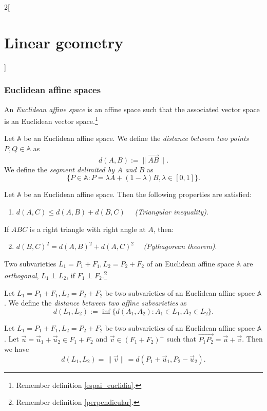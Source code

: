 \documentclass[class=article,10pt,crop=false]{standalone}
\begin{document}
\begin{multicols}{2}[\section{Linear geometry}]
\subsubsection*{Euclidean affine spaces}
\begin{definition}
An \textit{Euclidean affine space} is an affine space such that the associated vector space is an Euclidean vector space.\footnote{Remember definition \ref{espai_euclidia}.}
\end{definition}
\begin{definition}
Let $\mathbb{A}$ be an Euclidean affine space. We define the \textit{distance between two points $P,Q\in\mathbb{A}$} as $$d(A,B):=\|\overrightarrow{AB}\|.$$ We define the \textit{segment delimited by $A$ and $B$} as $$\{P\in\mathbb{A}:P=\lambda A+(1-\lambda)B,\lambda\in[0,1]\}.$$
\end{definition}
\begin{prop}
Let $\mathbb{A}$ be an Euclidean affine space. Then the following properties are satisfied:
\begin{enumerate}
    \item $d(A,C)\leq d(A,B)+d(B,C)\quad$ \textit{(Triangular inequality)}.
\end{enumerate}
If $ABC$ is a right triangle with right angle at $A$, then:
\begin{enumerate}
    \setcounter{enumi}{1}
    \item $d(B,C)^2=d(A,B)^2+d(A,C)^2\quad$ \textit{(Pythagorean theorem)}.
\end{enumerate}
\end{prop}
\begin{definition}
Two subvarieties $L_1=P_1+F_1,L_2=P_2+F_2$ of an Euclidean affine space $\mathbb{A}$ are \textit{orthogonal}, $L_1\perp L_2$, if $F_1\perp F_2$.\footnote{Remember definition \ref{perpendicular}.}
\end{definition}
\begin{definition}
Let $L_1=P_1+F_1,L_2=P_2+F_2$ be two subvarieties of an Euclidean affine space $\mathbb{A}$. We define the \textit{distance between two affine subvarieties} as $$d(L_1,L_2):=\inf\{d(A_1,A_2):A_1\in L_1, A_2\in L_2\}.$$
\end{definition}
\begin{theorem}
Let $L_1=P_1+F_1,L_2=P_2+F_2$ be two subvarieties of an Euclidean affine space $\mathbb{A}$. Let $\overrightarrow{u}=\overrightarrow{u}_1+\overrightarrow{u}_2\in F_1+F_2$ and $\overrightarrow{v}\in(F_1+F_2)^\perp$ such that $\overrightarrow{P_1P_2}=\overrightarrow{u}+\overrightarrow{v}$. Then we have $$d(L_1,L_2)=\|\overrightarrow{v}\|=d(P_1+\overrightarrow{u}_1,P_2-\overrightarrow{u}_2).$$
\end{theorem}

\end{multicols}
\end{document}
